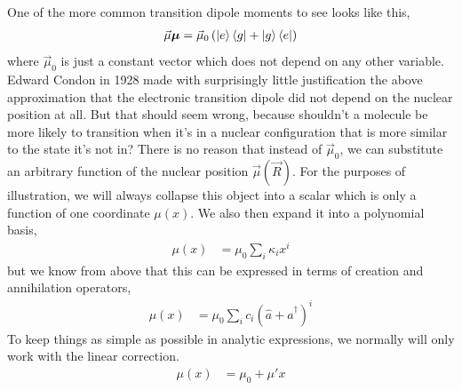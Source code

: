One of the more common transition dipole moments to see looks like this,
\begin{align}
	 \vec{\mu} \boldsymbol{\mu} = \vec{\mu}_0  \left( \ket{e}\bra{g} + \ket{g}\bra{e} \right)
\end{align}
where $\vec{\mu}_0 $ is just a constant vector which does not depend on any other variable.  Edward Condon in 1928 made with surprisingly little justification the above approximation that the electronic transition dipole did not depend on the nuclear position at all.  But that should seem wrong, because shouldn't a molecule be more likely to transition when it's in a nuclear configuration that is more similar to the state it's not in?  There is no reason that instead of $\vec{\mu}_0$, we can substitute an arbitrary function of the nuclear position $\vec{\mu} (\vec{R})$.  For the purposes of illustration, we will always collapse this object into a scalar which is only a function of one coordinate $\mu (x)$.  We also then expand it into a polynomial basis,
\begin{align}
	\mu(x) &= \mu_0  \sum_i \kappa_i x^i
\end{align}
but we know from above that this can be expressed in terms of creation and annihilation operators,
\begin{align}
	\mu(x) &= \mu_0  \sum_i c_i \left(\hat{a} + \hat{a}^{\dagger}\right)^i
\end{align}
To keep things as simple as possible in analytic expressions, we normally will only work with the linear correction.
\begin{align}
	\mu(x) &= \mu_0  + \mu' x
\end{align}
